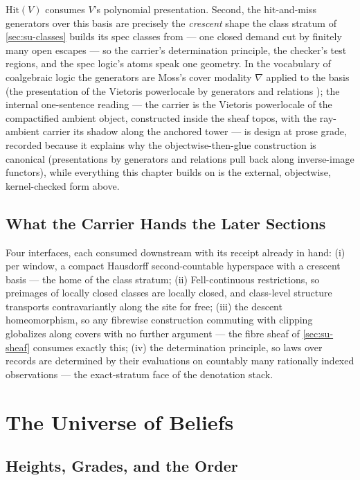 $\mathrm{Hit}(V)$ consumes $V$'s polynomial presentation. Second, the
hit-and-miss generators over this basis are precisely the
\emph{crescent} shape the class stratum of
\autoref{sec:su-classes} builds its spec classes from --- one
closed demand cut by finitely many open escapes --- so the carrier's
determination principle, the checker's test regions, and the spec
logic's atoms speak one geometry. In the vocabulary of coalgebraic
logic the generators are Moss's cover modality $\nabla$ applied to
the basis (the presentation of the Vietoris powerlocale by generators
and relations \cite{venema12}); the internal one-sentence reading ---
the carrier is the Vietoris powerlocale of the compactified ambient
object, constructed inside the sheaf topos, with the ray-ambient
carrier its shadow along the anchored tower
--- is design at prose grade, recorded because it explains why the
objectwise-then-glue construction is canonical (presentations by
generators and relations pull back along inverse-image functors),
while everything this chapter builds on is the external, objectwise,
kernel-checked form above.

\subsection{What the Carrier Hands the Later Sections}

Four
interfaces, each consumed downstream with its receipt already in
hand: (i) per window, a compact Hausdorff second-countable hyperspace
with a crescent basis --- the home of the class stratum; (ii)
Fell-continuous restrictions, so preimages of locally closed classes
are locally closed, and class-level structure transports
contravariantly along the site for free; (iii) the descent
homeomorphism, so any fibrewise construction commuting with clipping
globalizes along covers with no further argument --- the fibre sheaf
of \autoref{sec:su-sheaf} consumes exactly this; (iv) the
determination principle, so laws over records are determined by
their evaluations on countably many rationally indexed
observations --- the exact-stratum face of the denotation stack.
\section{The Universe of Beliefs}
\label{sec:su-denotation}

\subsection{Heights, Grades, and the Order}


